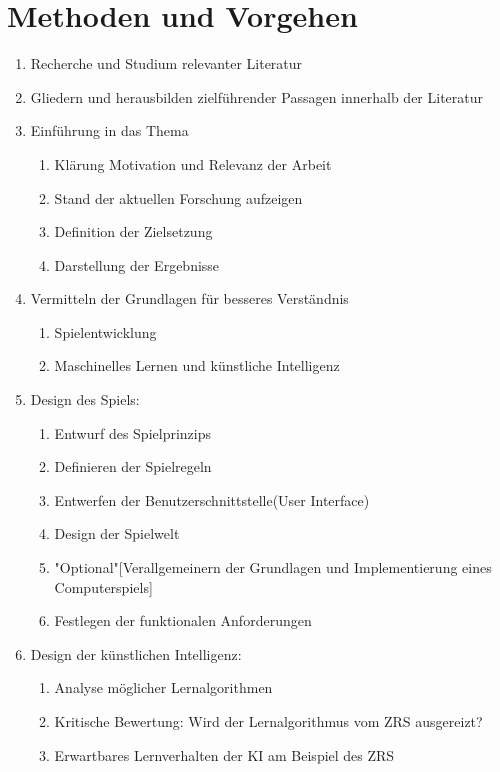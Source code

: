 \documentclass[12pt,a4paper]{article}
\begin{document}
\section*{Methoden und Vorgehen}
\begin{enumerate}
	\item Recherche und Studium relevanter Literatur
	
	\item Gliedern und herausbilden zielführender Passagen innerhalb der Literatur
	
	\item Einführung in das Thema
	\begin{enumerate}
		\item Klärung Motivation und Relevanz der Arbeit
		\item Stand der aktuellen Forschung aufzeigen
		\item Definition der Zielsetzung
		\item Darstellung der Ergebnisse
	\end{enumerate}		
	
	\item Vermitteln der Grundlagen für besseres Verständnis
	\begin{enumerate}
		\item Spielentwicklung
		\item Maschinelles Lernen und künstliche Intelligenz
	\end{enumerate}		
	
	\item Design des Spiels:
	\begin{enumerate}
		\item Entwurf des Spielprinzips
		\item Definieren der Spielregeln
		\item Entwerfen der Benutzerschnittstelle(User Interface)
		\item Design der Spielwelt 
		\item "Optional"[Verallgemeinern der Grundlagen und Implementierung eines Computerspiels]
		\item Festlegen der funktionalen Anforderungen
	\end{enumerate}

	\item Design der künstlichen Intelligenz:
	\begin{enumerate}
		\item Analyse möglicher Lernalgorithmen
		\item Kritische Bewertung: Wird der Lernalgorithmus vom ZRS ausgereizt?
		\item Erwartbares Lernverhalten der KI am Beispiel des ZRS
	\end{enumerate}
	

\end{enumerate}
\end{document}

